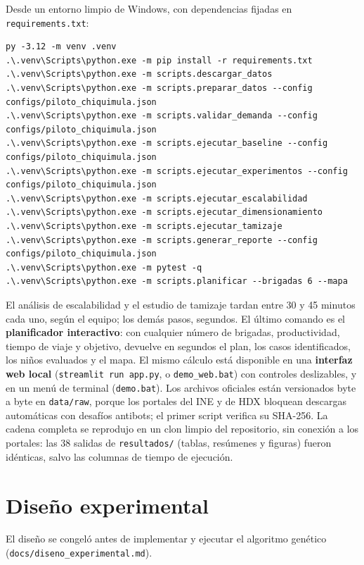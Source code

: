 \documentclass[11pt,letterpaper]{article}
\newcommand{\cod}[1]{\texttt{#1}}
\begin{document}
Desde un entorno limpio de Windows, con dependencias fijadas en \cod{requirements.txt}:
\begin{verbatim}
py -3.12 -m venv .venv
.\.venv\Scripts\python.exe -m pip install -r requirements.txt
.\.venv\Scripts\python.exe -m scripts.descargar_datos
.\.venv\Scripts\python.exe -m scripts.preparar_datos --config configs/piloto_chiquimula.json
.\.venv\Scripts\python.exe -m scripts.validar_demanda --config configs/piloto_chiquimula.json
.\.venv\Scripts\python.exe -m scripts.ejecutar_baseline --config configs/piloto_chiquimula.json
.\.venv\Scripts\python.exe -m scripts.ejecutar_experimentos --config configs/piloto_chiquimula.json
.\.venv\Scripts\python.exe -m scripts.ejecutar_escalabilidad
.\.venv\Scripts\python.exe -m scripts.ejecutar_dimensionamiento
.\.venv\Scripts\python.exe -m scripts.ejecutar_tamizaje
.\.venv\Scripts\python.exe -m scripts.generar_reporte --config configs/piloto_chiquimula.json
.\.venv\Scripts\python.exe -m pytest -q
.\.venv\Scripts\python.exe -m scripts.planificar --brigadas 6 --mapa
\end{verbatim}
El análisis de escalabilidad y el estudio de tamizaje tardan entre 30 y 45 minutos cada uno, según el equipo; los demás pasos, segundos. El último comando es el \textbf{planificador interactivo}: con cualquier número de brigadas, productividad, tiempo de viaje y objetivo, devuelve en segundos el plan, los casos identificados, los niños evaluados y el mapa. El mismo cálculo está disponible en una \textbf{interfaz web local} (\cod{streamlit run app.py}, o \cod{demo\_web.bat}) con controles deslizables, y en un menú de terminal (\cod{demo.bat}).
Los archivos oficiales están versionados byte a byte en \cod{data/raw}, porque los portales del INE y de HDX bloquean descargas automáticas con desafíos antibots; el primer script verifica su SHA-256. La cadena completa se reprodujo en un clon limpio del repositorio, sin conexión a los portales: las 38 salidas de \cod{resultados/} (tablas, resúmenes y figuras) fueron idénticas, salvo las columnas de tiempo de ejecución.

\section{Diseño experimental}
\label{sec:diseno}

El diseño se congeló antes de implementar y ejecutar el algoritmo genético (\cod{docs/diseno\_experimental.md}).
\end{document}
